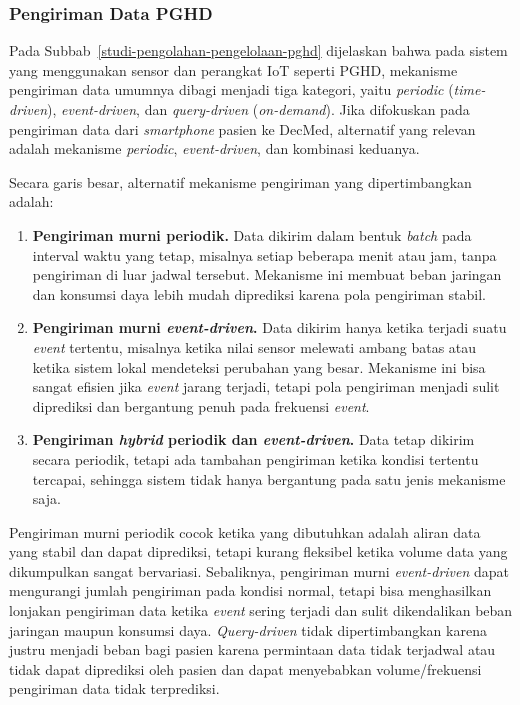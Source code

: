 \subsubsection{Pengiriman Data PGHD}\label{alternatif-trigger-pengiriman-pghd}

Pada Subbab~\ref{studi-pengolahan-pengelolaan-pghd} dijelaskan bahwa pada sistem yang menggunakan sensor dan perangkat IoT seperti PGHD, mekanisme pengiriman data umumnya dibagi menjadi tiga kategori, yaitu \textit{periodic} (\textit{time-driven}), \textit{event-driven}, dan \textit{query-driven} (\textit{on-demand}). 
Jika difokuskan pada pengiriman data dari \textit{smartphone} pasien ke DecMed, alternatif yang relevan adalah mekanisme \textit{periodic}, \textit{event-driven}, dan kombinasi keduanya.

Secara garis besar, alternatif mekanisme pengiriman yang dipertimbangkan adalah:

\begin{enumerate}
  \item \textbf{Pengiriman murni periodik.} 
  Data dikirim dalam bentuk \textit{batch} pada interval waktu yang tetap, misalnya setiap beberapa menit atau jam, tanpa pengiriman di luar jadwal tersebut. 
  Mekanisme ini membuat beban jaringan dan konsumsi daya lebih mudah diprediksi karena pola pengiriman stabil.

  \item \textbf{Pengiriman murni \textit{event-driven}.}
  Data dikirim hanya ketika terjadi suatu \textit{event} tertentu, misalnya ketika nilai sensor melewati ambang batas atau ketika sistem lokal mendeteksi perubahan yang besar. 
  Mekanisme ini bisa sangat efisien jika \textit{event} jarang terjadi, tetapi pola pengiriman menjadi sulit diprediksi dan bergantung penuh pada frekuensi \textit{event}.

  \item \textbf{Pengiriman \textit{hybrid} periodik dan \textit{event-driven}.}
  Data tetap dikirim secara periodik, tetapi ada tambahan pengiriman ketika kondisi tertentu tercapai, sehingga sistem tidak hanya bergantung pada satu jenis mekanisme saja.
\end{enumerate}  

Pengiriman murni periodik cocok ketika yang dibutuhkan adalah aliran data yang stabil dan dapat diprediksi, tetapi kurang fleksibel ketika volume data yang dikumpulkan sangat bervariasi. 
Sebaliknya, pengiriman murni \textit{event-driven} dapat mengurangi jumlah pengiriman pada kondisi normal, tetapi bisa menghasilkan lonjakan pengiriman data ketika \textit{event} sering terjadi dan sulit dikendalikan beban jaringan maupun konsumsi daya. 
\textit{Query-driven} tidak dipertimbangkan karena justru menjadi beban bagi pasien karena permintaan data tidak terjadwal atau tidak dapat diprediksi oleh pasien dan dapat menyebabkan volume/frekuensi pengiriman data tidak terprediksi.

